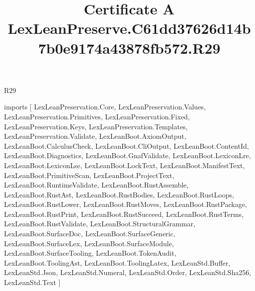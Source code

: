 \begin{lexlean}{R29}
\title{Certificate A LexLeanPreserve.C61dd37626d14b7b0e9174a43878fb572.R29}
\begin{coremodule}
imports [
  LexLeanPreservation.Core,
  LexLeanPreservation.Values,
  LexLeanPreservation.Primitives,
  LexLeanPreservation.Fixed,
  LexLeanPreservation.Keys,
  LexLeanPreservation.Templates,
  LexLeanPreservation.Validate,
  LexLeanBoot.AxiomOutput,
  LexLeanBoot.CalculusCheck,
  LexLeanBoot.CliOutput,
  LexLeanBoot.ContentId,
  LexLeanBoot.Diagnostics,
  LexLeanBoot.GnafValidate,
  LexLeanBoot.LexiconLre,
  LexLeanBoot.LexiconLse,
  LexLeanBoot.LockText,
  LexLeanBoot.ManifestText,
  LexLeanBoot.PrimitiveScan,
  LexLeanBoot.ProjectText,
  LexLeanBoot.RuntimeValidate,
  LexLeanBoot.RustAssemble,
  LexLeanBoot.RustAst,
  LexLeanBoot.RustBodies,
  LexLeanBoot.RustLoops,
  LexLeanBoot.RustLower,
  LexLeanBoot.RustMoves,
  LexLeanBoot.RustPackage,
  LexLeanBoot.RustPrint,
  LexLeanBoot.RustSucceed,
  LexLeanBoot.RustTerms,
  LexLeanBoot.RustValidate,
  LexLeanBoot.StructuralGrammar,
  LexLeanBoot.SurfaceDoc,
  LexLeanBoot.SurfaceGeneric,
  LexLeanBoot.SurfaceLex,
  LexLeanBoot.SurfaceModule,
  LexLeanBoot.SurfaceTooling,
  LexLeanBoot.TokenAudit,
  LexLeanBoot.ToolingAst,
  LexLeanBoot.ToolingLatex,
  LexLeanStd.Buffer,
  LexLeanStd.Json,
  LexLeanStd.Numeral,
  LexLeanStd.Order,
  LexLeanStd.Sha256,
  LexLeanStd.Text
]


\end{coremodule}
\end{lexlean}
